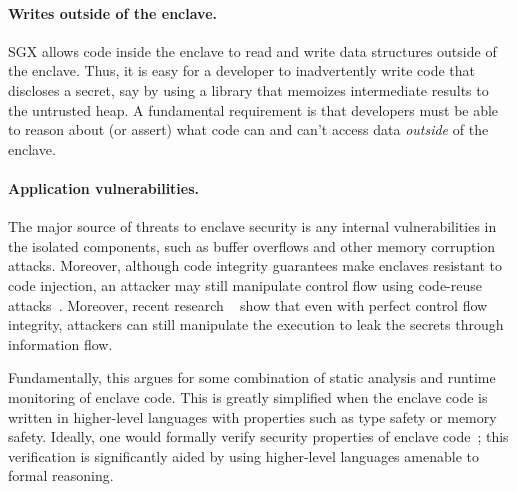 
\paragraph{Writes outside of the enclave.}
SGX allows code inside the enclave to read and write data structures 
outside of the enclave.  Thus, it is easy for a developer to inadvertently write
code that discloses a secret, say by using a library that memoizes intermediate results to the untrusted heap.
A fundamental requirement is that developers must be able to reason about (or assert)
what code can and can't access data {\em outside} of the enclave.


\paragraph{Application vulnerabilities.} 
The major source of threats to enclave security is any internal vulnerabilities in the isolated components,
such as buffer overflows and other memory corruption attacks.
Moreover, although \sgx{} code integrity guarantees make enclaves resistant to code injection,
an attacker may still manipulate control flow using code-reuse attacks~\cite{code-reuse-attacks}.
Moreover, recent research ~\cite{hudata} show that even with perfect control flow integrity,
attackers can still manipulate the execution to leak the secrets through information flow.

Fundamentally, this argues for some combination of static analysis
and runtime monitoring of 
enclave code.  This is greatly simplified when the enclave code is written in higher-level languages
with properties 
such as type safety or memory safety. %
Ideally, one would formally verify security properties of enclave code~\cite{moat}; this verification is significantly aided by using 
higher-level languages amenable to formal reasoning.

